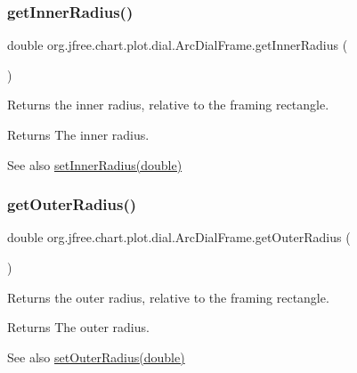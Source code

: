 \subsubsection{\texorpdfstring{get\+Inner\+Radius()}{getInnerRadius()}}
{\footnotesize\ttfamily double org.\+jfree.\+chart.\+plot.\+dial.\+Arc\+Dial\+Frame.\+get\+Inner\+Radius (\begin{DoxyParamCaption}{ }\end{DoxyParamCaption})}

Returns the inner radius, relative to the framing rectangle.

\begin{DoxyReturn}{Returns}
The inner radius.
\end{DoxyReturn}
\begin{DoxySeeAlso}{See also}
\mbox{\hyperlink{classorg_1_1jfree_1_1chart_1_1plot_1_1dial_1_1_arc_dial_frame_a08db4e0ceed0203c47767b810a199e0b}{set\+Inner\+Radius(double)}} 
\end{DoxySeeAlso}
\mbox{\label{classorg_1_1jfree_1_1chart_1_1plot_1_1dial_1_1_arc_dial_frame_a7f3b8ed6a85161689a6bad89a5c29b0a}} 
\subsubsection{\texorpdfstring{get\+Outer\+Radius()}{getOuterRadius()}}
{\footnotesize\ttfamily double org.\+jfree.\+chart.\+plot.\+dial.\+Arc\+Dial\+Frame.\+get\+Outer\+Radius (\begin{DoxyParamCaption}{ }\end{DoxyParamCaption})}

Returns the outer radius, relative to the framing rectangle.

\begin{DoxyReturn}{Returns}
The outer radius.
\end{DoxyReturn}
\begin{DoxySeeAlso}{See also}
\mbox{\hyperlink{classorg_1_1jfree_1_1chart_1_1plot_1_1dial_1_1_arc_dial_frame_a67c4b353c0c1e5d7cbd4b230d0df688c}{set\+Outer\+Radius(double)}} 
\end{DoxySeeAlso}
\mbox{\label{classorg_1_1jfree_1_1chart_1_1plot_1_1dial_1_1_arc_dial_frame_a7f1e9d19401c6c30e4cc16b22e99fd7e}} 
